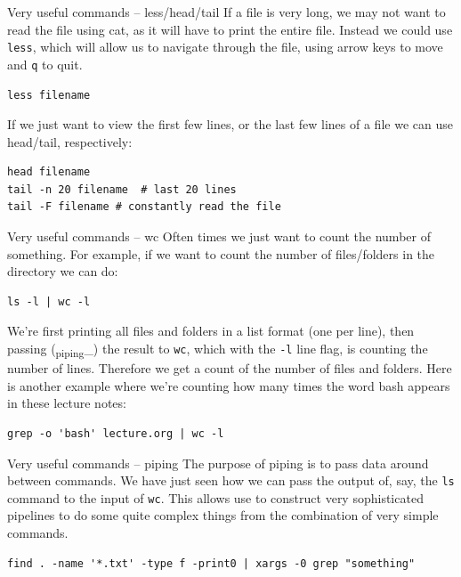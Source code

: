 \documentclass[10pt]{beamer}
\begin{document}
\begin{frame}[label={sec:org7d4fc9c},fragile]{Very useful commands -- less/head/tail}
 If a file is very long, we may not want to read the file using cat, as it will
have to print the entire file. Instead we could use \texttt{less}, which will allow us to
navigate through the file, using arrow keys to move and \texttt{q} to quit.

\begin{verbatim}
less filename
\end{verbatim}

If we just want to view the first few lines, or the last few lines of a file we
can use head/tail, respectively:

\begin{verbatim}
head filename
tail -n 20 filename  # last 20 lines
tail -F filename # constantly read the file
\end{verbatim}
\end{frame}

\begin{frame}[label={sec:org934d655},fragile]{Very useful commands -- wc}
 Often times we just want to count the number of something. For example, if we
want to count the number of files/folders in the directory we can do:

\begin{verbatim}
ls -l | wc -l
\end{verbatim}

We're first printing all files and folders in a list format (one per line), then
passing (\textsubscript{piping}\_) the result to \texttt{wc}, which with the \texttt{-l} line flag, is counting the
number of lines. Therefore we get a count of the number of files and
folders. Here is another example where we're counting how many times the word
bash appears in these lecture notes:

\begin{verbatim}
grep -o 'bash' lecture.org | wc -l
\end{verbatim}
\end{frame}

\begin{frame}[label={sec:orga086ef0},fragile]{Very useful commands -- piping}
 The purpose of piping is to pass data around between commands. We have just seen
how we can pass the output of, say, the \texttt{ls} command to  the input of \texttt{wc}. This
allows use to construct very sophisticated pipelines to do some quite complex
things from the combination of very simple commands.

\begin{verbatim}
find . -name '*.txt' -type f -print0 | xargs -0 grep "something"
\end{verbatim}
\end{frame}
\end{document}

